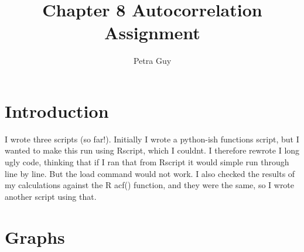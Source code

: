 \documentclass[a4paper]{article}
\title{Chapter 8 Autocorrelation Assignment}
\author{Petra Guy}
\begin{document}
\maketitle

\section{Introduction}
I wrote three scripts (so far!). Initially I wrote a python-ish functions script, 
but I wanted to make this run using Rscript, which I couldnt.
 I therefore rewrote I long ugly code, thinking that if I ran that
  from Rscript it would simple run through line by line. But the 
  load command would not work. I also checked the results of my 
  calculations against the R acf() function, and they were the same, 
  so I wrote another script using that. 

\section{Graphs}
\end{document}
